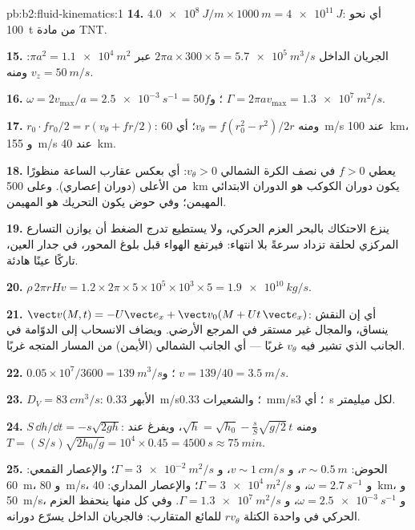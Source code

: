 \begin{solution}{pb:b2:fluid-kinematics:1}
\textbf{14.} $\qty{4.0e8}{J/m} \times \qty{1000}{m} = \qty{4e11}{J}$: أي نحو
\qty{100}{t} من مادة TNT.

\textbf{15.} الجريان الداخل $2\pi a \times 300 \times 5 = \qty{5.7e5}{m^3/s}$ عبر
$\pi a^2 = \qty{1.1e4}{m^2}$: ومنه $v_z = \qty{50}{m/s}$.

\textbf{16.} $\omega = 2v_{\max}/a = \qty{2.5e-3}{s^{-1}} = 50f$؛ و $\Gamma = 2\pi av_{\max}
= \qty{1.3e7}{m^2/s}$.

\textbf{17.} $r_0\cdot fr_0/2 = r(v_\theta + fr/2)$: ومنه $v_\theta = f(r_0^2 - r^2)/2r$؛
أي \qty{60}{m/s} عند \qty{100}{km}، و \qty{155}{m/s} عند \qty{40}{km}.

\textbf{18.} يعطي $f > 0$ في نصف الكرة الشمالي $v_\theta > 0$: أي
بعكس عقارب الساعة منظورًا من الأعلى (دوران إعصاري). وعلى
\qty{500}{km} يكون دوران الكوكب هو الدوران الابتدائي المهيمن؛ وفي
حوض يكون التحريك هو المهيمن.

\textbf{19.} ينزع الاحتكاك بالبحر العزم الحركي، ولا يستطيع تدرج
الضغط أن يوازن التسارع المركزي لحلقة تزداد سرعةً بلا انتهاء:
فيرتفع الهواء قبل بلوغ المحور، في جدار العين، تاركًا عينًا
هادئة.

\textbf{20.} $\rho\,2\pi rHv = 1.2 \times 2\pi \times 5 \times 10^5 \times 10^3 \times 5 =
\qty{1.9e10}{kg/s}$.

\textbf{21.} $\vect v(M, t) = -U\vect e_x + \vect v_0(M + Ut\,\vect e_x)$: أي إن
النقش ينساق، والمجال غير مستقر في المرجع الأرضي.
ويضاف الانسحاب إلى الدوّامة في الجانب الذي تشير فيه $v_\theta$
غربًا --- أي الجانب الشمالي (الأيمن) من المسار المتجه غربًا.

\textbf{22.} $0.05 \times 10^7/3600 = \qty{139}{m^3/s}$؛ و $v = 139/40 = \qty{3.5}{m/s}$.

\textbf{23.} $D_V = \qty{83}{cm^3/s}$: الأبهر \qty{0.33}{m/s}؛ والشعيرات
\qty{0.33}{mm/s}؛ أي \qty{3}{s} لكل ميليمتر.

\textbf{24.} $S\,\dd h/\dd t = -s\sqrt{2gh}$: ومنه $\sqrt h = \sqrt{h_0} -
\frac sS\sqrt{g/2}\,t$، ويفرغ عند $T = (S/s)\sqrt{2h_0/g} = 10^4 \times 0.45 =
\qty{4500}{s} \approx \qty{75}{min}$.

\textbf{25.} الحوض: $r \sim \qty{0.5}{m}$، و $v \sim \qty{1}{cm/s}$، و $\Gamma =
\qty{3e-2}{m^2/s}$؛ والإعصار القمعي: \qty{60}{m}، و \qty{80}{m/s}، و $\omega = \qty{2.7}{s^{-1}}$،
و $\Gamma = \qty{3e4}{m^2/s}$؛ والإعصار المداري: \qty{40}{km}، و \qty{50}{m/s}، و $\omega =
\qty{2.5e-3}{s^{-1}}$، و $\Gamma = \qty{1.3e7}{m^2/s}$. وفي كل منها ينحفظ
العزم الحركي في واحدة الكتلة $rv_\theta$ للمائع المتقارب:
فالجريان الداخل يسرّع دورانه.
\end{solution}
